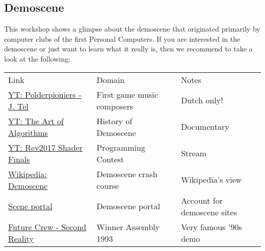\documentclass{article}
\begin{document}
\subsection{Demoscene}

This workshop shows a glimpse about the demoscene that originated primarily by computer clubs of the first Personal Computers.
If you are interested in the demoscene or just want to learn what it really is, then we recommend to take a look at the following:

\begin{tabular}{l|l|l}
Link & Domain & Notes \\
\href{https://www.youtube.com/watch?v=AdTANxS-LHg}{YT: Polderpioniers - J. Tel} & First game music composers & Dutch only! \\
\href{https://www.youtube.com/watch?v=5MexnBunH_g}{YT: The Art of Algorithms} & History of Demoscene & Documentary \\
\href{https://www.youtube.com/watch?v=O-1zEo7DD8w}{YT: Rev2017 Shader Finals} & Programming Contest & Stream \\
\href{https://en.wikipedia.org/wiki/Demoscene}{Wikipedia: Demoscene} & Demoscene crash course & Wikipedia's view \\
\href{https://id.scene.org/}{Scene portal} & Demoscene portal & Account for demoscene sites \\
\href{https://www.youtube.com/watch?v=rFv7mHTf0nA}{Future Crew - Second Reality} & Winner Assembly 1993 & Very famous '90s demo \\
\end{tabular}
\end{document}
